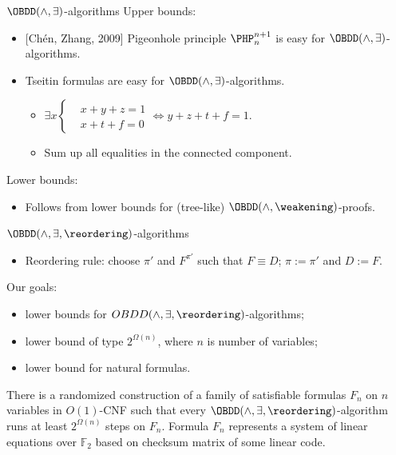 \begin{frame}{$\OBDD(\land, \exists)$-algorithms}
	Upper bounds:
    \begin{itemize}
        \item{} [Ch{\'{e}}n, Zhang, 2009] Pigeonhole principle $\PHP^{n + 1}_n$ is easy for $\OBDD(\land,
            \exists)$-algorithms.
        \item Tseitin formulas are easy for $\OBDD(\land, \exists)$-algorithms.
            \begin{itemize}
                \item $\exists x \left\{
                    \begin{aligned}
                        & x + y + z = 1 \\
                        & x + t + f = 0
                    \end{aligned}\right.
                    \Leftrightarrow y + z + t + f = 1$.
                \item Sum up all equalities in the connected component.
            \end{itemize}
    \end{itemize}
    
    Lower bounds:
    \begin{itemize}
        \item Follows from lower bounds for (tree-like) $\OBDD(\land, \weakening)$-proofs.
    \end{itemize}    
\end{frame}


\begin{frame}{$\OBDD(\land, \exists, \reordering)$-algorithms}
	\begin{itemize}
        \item Reordering rule: choose $\pi'$ and $F^{\pi'}$ such that $F \equiv D$; $\pi := \pi'$ and $D
            := F$.
    \end{itemize}

    Our goals:
    \begin{itemize}
        \item lower bounds for $OBDD(\land, \exists, \reordering)$-algorithms;
        \item lower bound of type $2^{\Omega(n)}$, where $n$ is number of variables;
        \item lower bound for natural formulas.
    \end{itemize}

    \pause
    \begin{theorem}
        There is a randomized construction of a family of satisfiable formulas $F_n$ on $n$ variables in
        $O(1)$-CNF such that every $\OBDD(\land, \exists, \reordering)$-algorithm runs at least
        $2^{\Omega(n)}$ steps on $F_n$. Formula $F_n$ represents a system of linear equations over
        $\mathbb{F}_2$ based on checksum matrix of some linear code.    
    \end{theorem}
\end{frame}